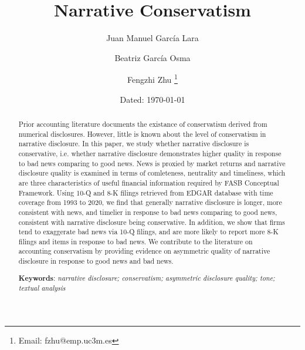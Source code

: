 \documentclass[a4paper]{article}
\begin{document}
	
	\title{Narrative Conservatism}
	
	\author{Juan Manuel Garc\'ia Lara}
	
	\author{Beatriz Garc\'ia Osma}
	
	\author{Fengzhi Zhu%
		\thanks{Email: fzhu@emp.uc3m.es}}
	
	
	\date{Dated: \today}
	
	\maketitle
\thispagestyle{empty}
\begin{spacing}{2}
\begin{abstract}
	Prior accounting literature documents the existance of conservatism derived from numerical disclosures. However, little is known about the level of conservatism in narrative disclosure. In this paper, we study whether narrative disclosure is conservative, i.e. whether narrative disclosure demonstrates higher quality in response to bad news comparing to good news. News is proxied by market returns and narrative disclosure quality is examined in terms of comleteness, neutrality and timeliness, which are three characteristics of useful financial information required by FASB Conceptual Framework. Using 10-Q and 8-K filings retrieved from EDGAR database with time coverage from 1993 to 2020, we find that generally narrative disclosure is longer, more consistent with news, and timelier in response to bad news comparing to good news, consistent with narrative disclosure being conservative. In addition, we show that firms tend to exaggerate bad news via 10-Q filings, and are more likely to report more 8-K filings and items in response to bad news.
	We contribute to the literature on accounting conservatism by providing evidence on asymmetric quality of narrative disclosure in response to good news and bad news.\\
	\newline
	
	\textbf{Keywords}: \textit{narrative disclosure; conservatism; asymmetric disclosure quality; tone; textual analysis}
\end{abstract}

\clearpage

\setcounter{page}{1}

\end{spacing}
\end{document}
